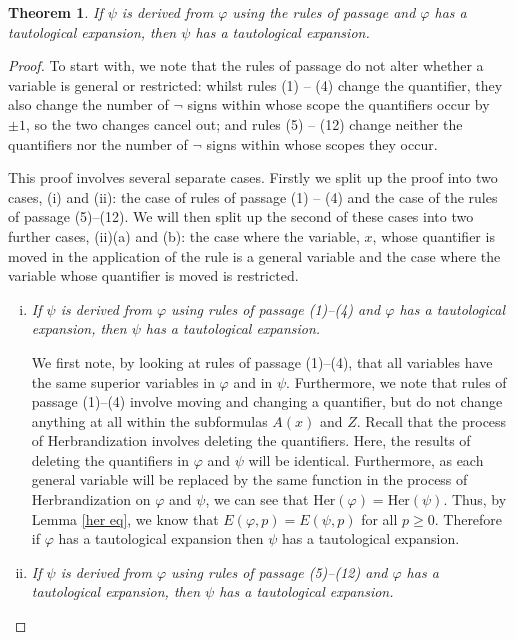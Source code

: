 \documentclass[a4paper,12pt]{report}
\newtheorem{theo}{Theorem}
\theoremstyle{definition}
\begin{document}
\begin{theo}
\label{c theorem}
If $\psi$ is derived from $\varphi$ using the rules of passage and $\varphi$ has a tautological expansion, then $\psi$ has a tautological expansion.
\end{theo}
\begin{proof}
To start with, we note that the rules of passage do not alter whether a variable is general or restricted: whilst rules (1) -- (4) change the quantifier, they also change the number of $\neg$ signs within whose scope the quantifiers occur by $\pm 1$, so the two changes cancel out; and rules (5) -- (12) change neither the quantifiers nor the number of $\neg$ signs within whose scopes they occur.

This proof involves several separate cases. Firstly we split up the proof into two cases, (i) and (ii): the case of rules of passage (1) -- (4) and the case of the rules of passage (5)--(12). We will then split up the second of these cases into two further cases, (ii)(a) and (b): the case where the variable, $x$, whose quantifier is moved in the application of the rule is a general variable and the case where the variable whose quantifier is moved is restricted.

\begin{enumerate}[(i)]
\item \emph{If $\psi$ is derived from $\varphi$ using rules of passage (1)--(4) and $\varphi$ has a tautological expansion, then $\psi$ has a tautological expansion.}

We first note, by looking at rules of passage (1)--(4), that all variables have the same superior variables in $\varphi$ and in $\psi$. Furthermore, we note that rules of passage (1)--(4) involve moving and changing a quantifier, but do not change anything at all within the subformulas $A(x)$ and $Z$. Recall that the process of Herbrandization involves deleting the quantifiers. Here, the results of deleting the quantifiers in $\varphi$ and $\psi$ will be identical. Furthermore, as each general variable will be replaced by the same function in the process of Herbrandization on $\varphi$ and $\psi$, we can see that $\mbox{Her}(\varphi) = \mbox{Her}(\psi)$. Thus, by Lemma \ref{her eq}, we know that $E(\varphi, p) = E(\psi, p)$ for all $p \ge 0$. Therefore if $\varphi$ has a tautological expansion then $\psi$ has a tautological expansion.  

\item \emph{If $\psi$ is derived from $\varphi$ using rules of passage (5)--(12) and $\varphi$ has a tautological expansion, then $\psi$ has a tautological expansion.}


\end{enumerate}
\end{proof}
\end{document}
